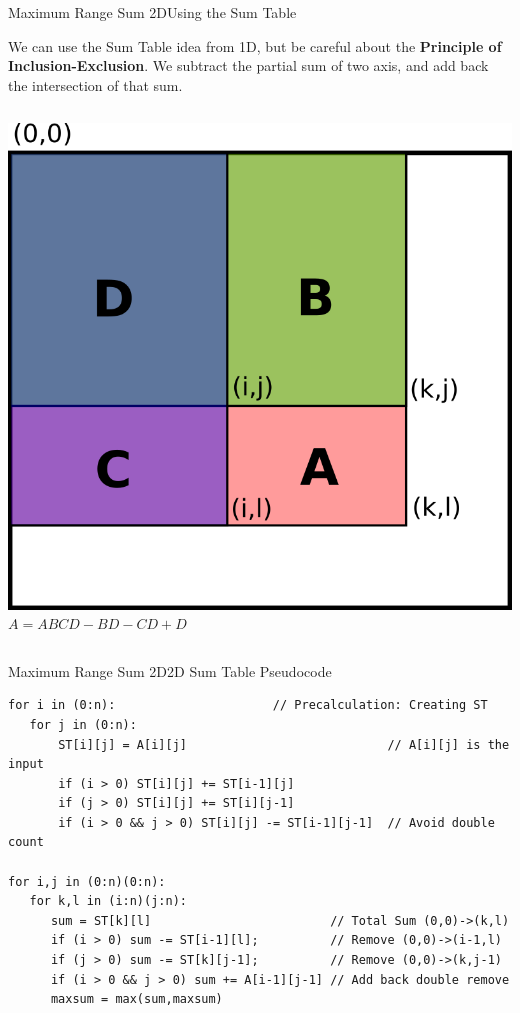 \begin{frame}[fragile]{Maximum Range Sum 2D}{Using the Sum Table}

We can use the Sum Table idea from 1D, but be careful about the {\bf Principle of Inclusion-Exclusion}. We subtract the partial sum of two axis, and add back the intersection of that sum.
\bigskip

\begin{columns}
  \hfill\includegraphics[width=.6\textwidth]{img/inclusion_exclusion}
  $A = ABCD - BD - CD + D$
\end{columns}

\end{frame}

\begin{frame}[fragile]{Maximum Range Sum 2D}{2D Sum Table Pseudocode}
\begin{block}{}
{\smaller
\begin{verbatim}
for i in (0:n):                      // Precalculation: Creating ST
   for j in (0:n):
       ST[i][j] = A[i][j]                            // A[i][j] is the input
       if (i > 0) ST[i][j] += ST[i-1][j]
       if (j > 0) ST[i][j] += ST[i][j-1]
       if (i > 0 && j > 0) ST[i][j] -= ST[i-1][j-1]  // Avoid double count

for i,j in (0:n)(0:n):
   for k,l in (i:n)(j:n):
      sum = ST[k][l]                         // Total Sum (0,0)->(k,l)
      if (i > 0) sum -= ST[i-1][l];          // Remove (0,0)->(i-1,l)
      if (j > 0) sum -= ST[k][j-1];          // Remove (0,0)->(k,j-1)
      if (i > 0 && j > 0) sum += A[i-1][j-1] // Add back double remove
      maxsum = max(sum,maxsum)
\end{verbatim}
}
\end{block}

\end{frame}

